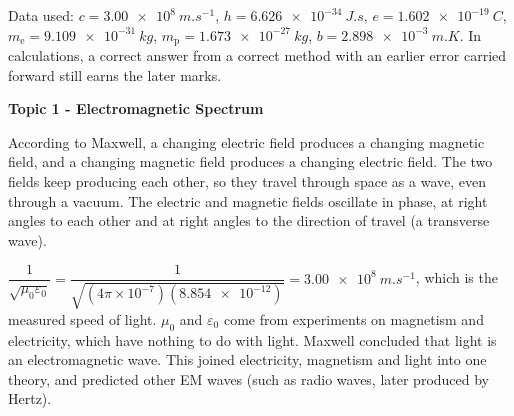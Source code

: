 \documentclass[12pt]{article}
\newcommand\anstopic[1]{\par\Needspace{8\baselineskip}\vspace{4mm}%
  \begin{center}{\headfont\bfseries\fontsize{14}{18}\selectfont #1\par}\end{center}\vspace{2pt}}
\begin{document}

Data used: $c = \qty{3.00e8}{m.s^{-1}}$, $h = \qty{6.626e-34}{J.s}$, $e = \qty{1.602e-19}{C}$,
$m_\mathrm{e} = \qty{9.109e-31}{kg}$, $m_\mathrm{p} = \qty{1.673e-27}{kg}$, $b = \qty{2.898e-3}{m.K}$.
In calculations, a correct answer from a correct method with an earlier error carried forward still
earns the later marks.

\anstopic{Topic 1 - Electromagnetic Spectrum}

\ansq
{}
\begin{crit}
\end{crit}
\sample
According to Maxwell, a changing electric field produces a changing magnetic field, and a changing
magnetic field produces a changing electric field. The two fields keep producing each other, so they
travel through space as a wave, even through a vacuum. The electric and magnetic fields oscillate in
phase, at right angles to each other and at right angles to the direction of travel (a transverse wave).
\begin{center}
\end{center}
\begin{crit}
\end{crit}
\sample
$\dfrac{1}{\sqrt{\mu_0\varepsilon_0}} = \dfrac{1}{\sqrt{(4\pi\times10^{-7})(\num{8.854e-12})}}
= \qty{3.00e8}{m.s^{-1}}$, which is the measured speed of light. $\mu_0$ and $\varepsilon_0$ come from
experiments on magnetism and electricity, which have nothing to do with light. Maxwell concluded that light
is an electromagnetic wave. This joined electricity, magnetism and light into one theory, and predicted
other EM waves (such as radio waves, later produced by Hertz).
\end{document}
